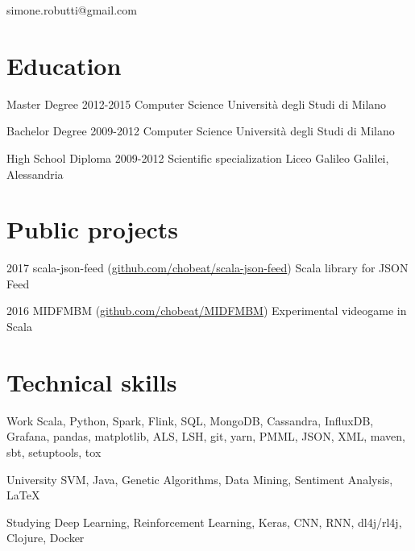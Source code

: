 \documentclass{tccv}
\begin{document}
    {simone.robutti@gmail.com}

\section{Education}

\begin{yearlist}

\item[Master Degree]{2012-2015}
     {Computer Science}
     {Università degli Studi di Milano}

\item[Bachelor Degree]{2009-2012}
{Computer Science}
{Università degli Studi di Milano}

\item[High School Diploma]{2009-2012}
{Scientific specialization}
{Liceo Galileo Galilei, Alessandria}



\end{yearlist}

\section{Public projects}

\begin{yearlist}

\item{2017}
     {scala-json-feed (\href{https://github.com/chobeat/scala-json-feed}{github.com/chobeat/scala-json-feed})}
     {Scala library for JSON Feed}

\item{2016}
     {MIDFMBM (\href{https://github.com/chobeat/MIDFMBM}{github.com/chobeat/MIDFMBM})}
     {Experimental videogame in Scala}

\end{yearlist}

\section{Technical skills}

\begin{factlist}

\item{Work}
     {Scala, Python, Spark, Flink, SQL, MongoDB, Cassandra, InfluxDB, Grafana, pandas, matplotlib, ALS, LSH, git, yarn, PMML, JSON, XML, maven, sbt, setuptools, tox}

\item{University}
{SVM, Java, Genetic Algorithms, Data Mining, Sentiment Analysis, \LaTeX}

\item{Studying}
     {Deep Learning, Reinforcement Learning, Keras, CNN, RNN, dl4j/rl4j, Clojure, Docker}


\end{factlist}
\end{document}

